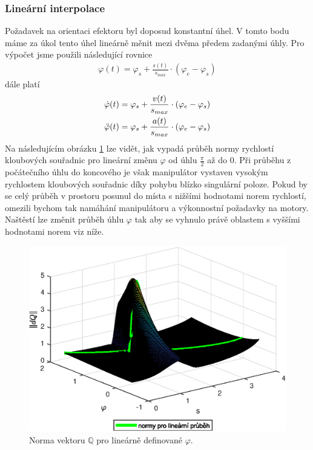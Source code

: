 \documentclass{article}
\begin{document}
			\subsubsection{Lineární interpolace}
				Požadavek na orientaci efektoru byl doposud konstantní úhel. V tomto bodu máme za úkol tento úhel lineárně měnit mezi dvěma předem zadanými úhly. Pro výpočet jsme použili následující rovnice 
					\begin{align}
						\varphi(t) = \varphi_s+\frac{s(t)}{s_{max}}\cdot(\varphi_e-\varphi_s)
					\end{align}
				dále platí
					\begin{align}
						\dot{\varphi}(t) = \varphi_s+\frac{v(t)}{s_{max}}\cdot(\varphi_e-\varphi_s)\\
						\Ddot{\varphi}(t) = \varphi_s+\frac{a(t)}{s_{max}}\cdot(\varphi_e-\varphi_s)
					\end{align}
				Na následujícím obrázku \ref{pic:Norma_vekt_dQ_lin} lze vidět, jak vypadá průběh normy rychlostí kloubových souřadnic pro lineární změnu \(\varphi\) od úhlu \(\frac{\pi}{2}\) až do \(0\). Při průběhu z počátečního úhlu do koncového je však manipulátor vystaven vysokým rychlostem kloubových souřadnic díky pohybu blízko singulární poloze. Pokud by se celý průběh v prostoru posunul do místa s nižšími hodnotami norem rychlostí, omezili bychom tak namáhání manipulátoru a výkonnostní požadavky na motory. Naštěstí lze změnit průběh úhlu \(\varphi\) tak aby se vyhnulo právě oblastem s vyššími hodnotami norem viz níže.
					\begin{figure}[H]
						\centering
						\includegraphics[width=\textwidth]{./Graphics/6_Graphics/Norma_vekt_dQ_lin3D.eps}
							\caption{Norma vektoru $\mathbb{Q}$ pro lineárně definované $\varphi$.}
						\label{pic:Norma_vekt_dQ_lin}
					\end{figure}
\end{document}
